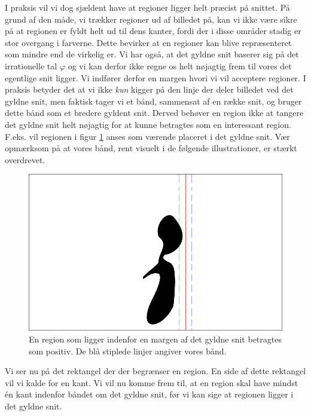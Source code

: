 {I praksis vil vi dog sjældent have at regioner ligger helt præcist på
snittet.  På grund af den måde, vi trækker regioner ud af billedet på,
kan vi ikke være sikre på at regionen er fyldt helt ud til dens kanter,
fordi der i disse områder stadig er stor overgang i farverne.  Dette
bevirker at en regioner kan blive repræsenteret som mindre end de
virkelig er.  Vi har også, at det gyldne snit baserer sig på det
irrationelle tal $\varphi$ og vi kan derfor ikke regne os helt nøjagtig
frem til vores det egentlige snit ligger.  Vi indfører derfor en margen
hvori vi vil acceptere regioner.  I praksis betyder det at vi ikke
\emph{kun} kigger på den linje der deler billedet ved det gyldne snit,
men faktisk tager vi et bånd, sammensat af en række snit, og bruger
dette bånd som et bredere gyldent snit.  Derved behøver en region ikke
at tangere det gyldne snit helt nøjagtig for at kunne betragtes som en
interessant region. F.eks. vil regionen i figur \ref{pos_naiv_margin_1}
anses som værende placeret i det gyldne snit.  Vær opmærksom på at vores
bånd, rent visuelt i de følgende illustrationer, er stærkt overdrevet.
\begin{figure}[h]
	\begin{center}
		\includegraphics[scale=\imgscale,angle=0]{afsnit/vores_implementation/billeder/naiv_algoritme/naiv_positiv_blob_margin_1}
	\end{center}
	\caption[Positiv region i margen]{En region som
	ligger indenfor en margen af det gyldne snit betragtes som
	positiv. De blå stiplede linjer angiver vores bånd.}
	\label{pos_naiv_margin_1}
\end{figure}

Vi ser nu på det rektangel der der begrænser en region.  En side af
dette rektangel vil vi kalde for en kant.  Vi vil nu komme frem til, at
en region skal have mindst én kant indenfor båndet om det gyldne snit,
før vi kan sige at regionen ligger i det gyldne snit.

}
